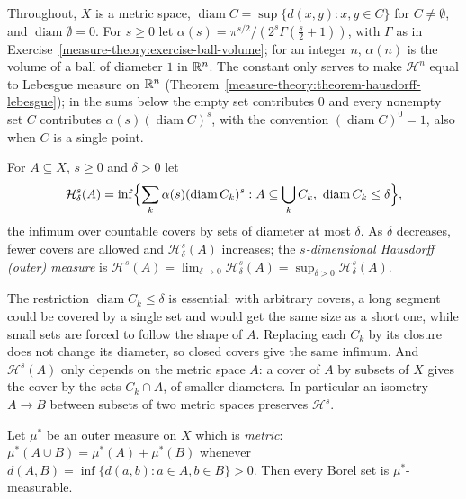 Throughout, $X$ is a metric space, $\operatorname{diam}C = \sup\{d(x, y) : x, y \in C\}$ for $C \neq \emptyset$, and $\operatorname{diam}\emptyset = 0$. For $s \geq 0$ let
$\alpha(s) = \pi^{s/2}/(2^s\Gamma(\frac s2 + 1))$, with $\Gamma$ as in Exercise~\ref{measure-theory:exercise-ball-volume}; for an integer $n$, $\alpha(n)$ is the volume of a ball of
diameter $1$ in $\mathbb{R}^n$. The constant only serves to make $\mathcal{H}^n$ equal to Lebesgue measure on $\mathbb{R}^n$ (Theorem~\ref{measure-theory:theorem-hausdorff-lebesgue}); in the sums below
the empty set contributes $0$ and every nonempty set $C$ contributes $\alpha(s)(\operatorname{diam}C)^s$, with the convention $(\operatorname{diam}C)^0 = 1$, also when $C$ is a
single point.

\begin{definition}\label{measure-theory:definition-hausdorff}
For $A \subseteq X$, $s \geq 0$ and $\delta > 0$ let
\[
\mathcal{H}^s_\delta(A) = \inf\Bigl\{\sum_k\alpha(s)(\operatorname{diam}C_k)^s : A \subseteq \bigcup_kC_k,\ \operatorname{diam}C_k \leq \delta\Bigr\},
\]
the infimum over countable covers by sets of diameter at most $\delta$. As $\delta$ decreases, fewer covers are allowed and $\mathcal{H}^s_\delta(A)$ increases; the
\emph{$s$-dimensional Hausdorff (outer) measure} is $\mathcal{H}^s(A) = \lim_{\delta \to 0}\mathcal{H}^s_\delta(A) = \sup_{\delta > 0}\mathcal{H}^s_\delta(A)$.
\end{definition}

The restriction $\operatorname{diam}C_k \leq \delta$ is essential: with arbitrary covers, a long segment could be covered by a single set and would get the same size as a short one, while
small sets are forced to follow the shape of $A$. Replacing each $C_k$ by its closure does not change its diameter, so closed covers give the same infimum. And $\mathcal{H}^s(A)$ only
depends on the metric space $A$: a cover of $A$ by subsets of $X$ gives the cover by the sets $C_k \cap A$, of smaller diameters. In particular an isometry $A \to B$ between subsets of two
metric spaces preserves $\mathcal{H}^s$.

\begin{lemma}\label{measure-theory:lemma-metric-outer-measure}
Let $\mu^*$ be an outer measure on $X$ which is \emph{metric}: $\mu^*(A \cup B) = \mu^*(A) + \mu^*(B)$ whenever $d(A, B) = \inf\{d(a, b) : a \in A, b \in B\} > 0$. Then every Borel set is
$\mu^*$-measurable.
\end{lemma}


